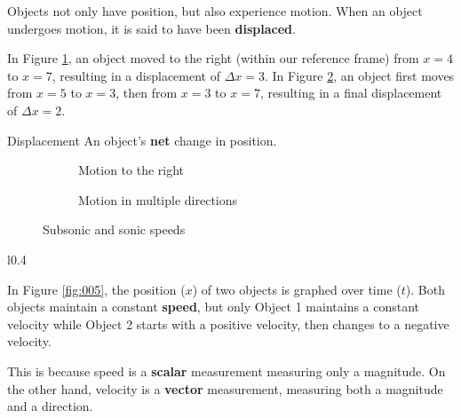 \documentclass[12pt, letterpaper]{article}
\begin{document}
Objects not only have position, but also experience motion. When an object undergoes motion,
it is said to have been \textbf{displaced}.

In Figure \ref{fig:003}, an object moved to the right (within our reference frame) from 
$x=4$ to $x=7$, resulting in a displacement of $\Delta x=3$. In Figure \ref{fig:004}, an
object first moves from $x=5$ to $x=3$, then from $x=3$ to $x=7$, resulting in a final
displacement of $\Delta x=2$.

\begin{definition}{Displacement}
  An object's \textbf{net} change in position.
\end{definition}

\vspace{-2pt}

\begin{figure}[H]
  \centering
  \begin{subfigure}[t]{0.4\textwidth}
    \centering
    
    \caption{Motion to the right}
    \label{fig:003}
  \end{subfigure}
  \begin{subfigure}[t]{0.4\textwidth}
    \centering
    
    \caption{Motion in multiple directions}
    \label{fig:004}
  \end{subfigure}
  \caption{Subsonic and sonic speeds}
  \label{fig:subandsonic}
\end{figure}

\begin{wrapfigure}[9]{l}{0.4\textwidth}
  \centering
  
\caption{Displacement displayed graphically}
\label{fig:005}
\end{wrapfigure}

\newpage

In Figure \ref{fig:005}, the position ($x$) of two objects is graphed over time ($t$).
Both objects maintain a constant \textbf{speed}, but only Object 1 maintains a constant
velocity while Object 2 starts with a positive velocity, then changes to a negative velocity.

This is because speed is a \textbf{scalar} measurement measuring only a magnitude. On the
other hand, velocity is a \textbf{vector} measurement, measuring both a magnitude and a
direction.
\end{document}
